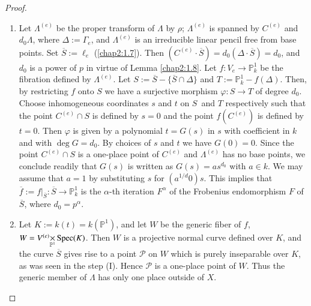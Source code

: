\begin{proof}
\begin{enumerate}
\renewcommand{\theenumi}{\Roman{enumi}}
\renewcommand{\labelenumi}{\rm(\theenumi)}
\item Let $\Lambda^{(e)}$ be the proper transform of $\Lambda$ by
  $\rho$; $\Lambda^{(e)}$ is spanned by $C^{(e)}$ and $d_{0}\Lambda$,
  where $\Delta:=\Gamma_{e}$, and $\Lambda^{(e)}$ is an irreducible
  linear pencil free from base points. Set $\overline{S}:=\ell_{e}$
  (\cf \ref{chap2:1.7}). Then
  $(C^{(e)}\cdot\overline{S})=d_{0}(\Delta\cdot\overline{S})=d_{0}$,
  and $d_{0}$ is a power of $p$ in virtue of Lemma \ref{chap2:1.8}. Let
  $f:V_{e}\to \mathbb{P}^{1}_{k}$ be the fibration defined by
  $\Lambda^{(e)}$. Let $S:=\overline{S}-\{\overline{S}\cap \Delta\}$
  and $T:=\mathbb{P}^{1}_{k}-f(\Delta)$. Then, by restricting $f$ onto
  $S$ we have a surjective morphism $\varphi:S\to T$ of degree
  $d_{0}$. Choose inhomogeneous coordinates $s$ and $t$ on
  $S$\pageoriginale\ and $T$ respectively such that the point
  $C^{(e)}\cap S$ is defined by $s=0$ and the point $f(C^{(e)})$ is
  defined by $t=0$. Then $\varphi$ is given by a polynomial $t=G(s)$
  in $s$ with coefficient in $k$ and with $\deg G=d_{0}$. By choices
  of $s$ and $t$ we have $G(0)=0$. Since the point $C^{(e)}\cap S$ is
  a one-place point of $C^{(e)}$ and $\Lambda^{(e)}$ has no base
  points, we conclude readily that $G(s)$ is written as
  $G(s)=as^{d_{0}}$ with $a\in k$. We may assume that $a=1$ by
  substituting $s$ for $(a^{1/d}0)s$. This implies that
  $\overline{f}:=f|_{\overline{S}}:\overline{S}\to \mathbb{P}^{1}_{k}$
  is the $\alpha$-th iteration $F^{\alpha}$ of the Frobenius
  endomorphism $F$ of $\overline{S}$, where $d_{0}=p^{\alpha}$.

\item Let $K:=k(t)=k(\mathbb{P}^{1})$, and let $W$ be the generic
  fiber of $f$, \iec
  $W=\fprod{V^{(e)}}{\Spec(K)}{\mathbb{P}^{1}}$. Then $W$ is a
  projective normal curve defined over $K$, and the curve
  $\overline{S}$ gives rise to a point $\mathscr{P}$ on $W$ which is
  purely inseparable over $K$, as was seen in the step (I). Hence
  $\mathscr{P}$ is a one-place point of $W$. Thus the generic member
  of $\Lambda$ has only one place outside of $X$. 
\end{enumerate}
\end{proof}

